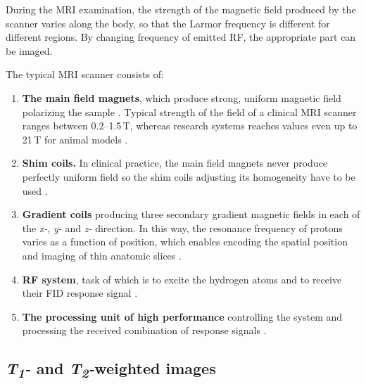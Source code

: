 During the MRI examination, the strength of the magnetic field produced by the scanner varies along the body, so that the Larmor frequency is different for different regions. By changing frequency of emitted RF, the appropriate part can be imaged. 

The typical MRI scanner consists of:
\begin{enumerate}
\item \textbf{The main field magnets}, which produce strong, uniform magnetic field polarizing the sample \cite{biomedical_hanbook_imaging}. Typical strength of the field of a clinical MRI scanner ranges between 0.2--1.5\,T, whereas research systems reaches values even up to 21\,T for animal models \cite{grover2015magnetic, sharma200821}.
\item \textbf{Shim coils.} In clinical practice, the main field magnets never produce perfectly uniform field so the shim coils adjusting its homogeneity have to be used \cite{biomedical_hanbook_imaging}.
\item \textbf{Gradient coils} producing three secondary gradient magnetic fields in each of the \textit{x-}, \textit{y-} and \textit{z-} direction. In this way, the resonance frequency of protons varies as a function of position, which enables encoding the spatial position and imaging of thin anatomic slices \cite{hidalgo2010theory}.
\item \textbf{RF system}, task of which is to excite the hydrogen atoms and to receive their FID response signal \cite{biomedical_hanbook_imaging}.
\item \textbf{The processing unit of high performance} controlling the system and processing the received combination of response signals \cite{biomedical_hanbook_imaging}.
\end{enumerate}

\subsection{\textit{T\textsubscript{1}-} and \textit{T\textsubscript{2}-}weighted images}

